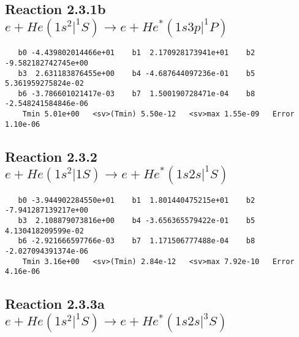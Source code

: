 \documentclass[12pt]{article}
\begin{document}
\newpage
\subsection{
Reaction 2.3.1b $e + He(1s^2|^1S) \rightarrow e + He^*(1s3p|^1P)$}















\begin{small}\begin{verbatim}
   b0 -4.439802014466e+01    b1  2.170928173941e+01    b2 -9.582182742745e+00
   b3  2.631183876455e+00    b4 -4.687644097236e-01    b5  5.361959275824e-02
   b6 -3.786601021417e-03    b7  1.500190728471e-04    b8 -2.548241584846e-06
    Tmin 5.01e+00   <sv>(Tmin) 5.50e-12   <sv>max 1.55e-09   Error 1.10e-06
\end{verbatim}\end{small}

\newpage
\subsection{
Reaction 2.3.2 $e + He(1s^2|1S) \rightarrow e + He^*(1s2s|^1S)$}















\begin{small}\begin{verbatim}
   b0 -3.944902284550e+01    b1  1.801440475215e+01    b2 -7.941287139217e+00
   b3  2.108879073816e+00    b4 -3.656365579422e-01    b5  4.130418209599e-02
   b6 -2.921666597766e-03    b7  1.171506777488e-04    b8 -2.027094391374e-06
    Tmin 3.16e+00   <sv>(Tmin) 2.84e-12   <sv>max 7.92e-10   Error 4.16e-06
\end{verbatim}\end{small}

\newpage
\subsection{
Reaction 2.3.3a $  e + He(1s^2|^1S) \rightarrow e + He^*(1s2s|^3S)$}
\end{document}
